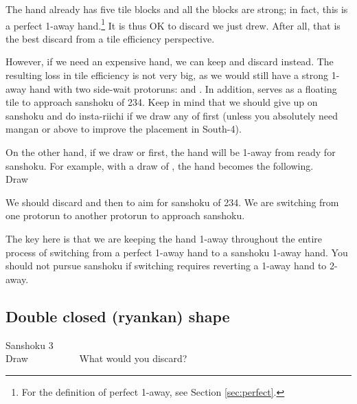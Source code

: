 \bigskip
The hand already has five tile blocks and all the blocks are strong; in fact, this is a perfect 1-away hand.\footnote{For the definition of perfect 1-away, see Section \ref{sec:perfect}.} It is thus OK to discard {\LARGE{}} we just drew. After all, that is the best discard from a tile efficiency perspective. 

\bigskip
However, if we need an expensive hand, we can keep {\LARGE{}} and discard {\LARGE{}} instead. The resulting loss in tile efficiency is not very big, as we would still have a strong 1-away hand with two side-wait protoruns: {\LARGE{}} and {\LARGE{}}. In addition, {\LARGE{}} serves as a floating tile to approach {\jap sanshoku} of 234. 
Keep in mind that we should give up on {\jap sanshoku} and do insta-riichi if we draw any of {\LARGE{}} first (unless you absolutely need {\jap mangan} or above to improve the placement in South-4). 

\bigskip
On the other hand, if we draw {\LARGE{}} or {\LARGE{}} first, the hand will be 1-away from ready for {\jap sanshoku}. For example, with a draw of {\LARGE{}}, the hand becomes the following. 
\bp
{}~\\
\hfill\footnotesize{Draw~~~~~~~~~~~~~~~}
\ep

We should discard {\LARGE{}} and then {\LARGE{}} to aim for {\jap sanshoku} of 234. We are switching from one protorun {\LARGE{}} to another protorun {\LARGE{}} to approach {\jap sanshoku}. 

\bigskip
The key here is that we are keeping the hand 1-away throughout the entire process of switching from a perfect 1-away hand to a {\jap sanshoku} 1-away hand. You should not pursue {\jap sanshoku} if switching requires reverting a 1-away hand to 2-away. 


\bigskip
\subsection{Double closed ({\jap ryankan}) shape}\label{sec:san3}

\begin{itembox}[r]{{\jap Sanshoku} 3}
\bp
{}~\\
\hfill\footnotesize{Draw~~~~~~~~~~}
\ep
\vspace{-17pt}What would you discard? \vspace{-5pt}
\end{itembox}

